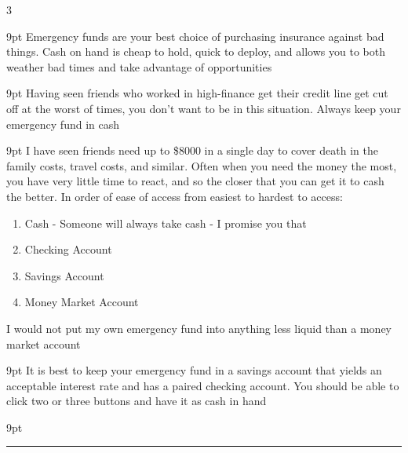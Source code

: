\documentclass[landscape]{article}
\newcommand{\myline}{\vspace{4pt}\hrule  \vspace{4pt}}
\newcommand{\commasep}[1]{\num[group-separator={,}]{#1}}
\newcommand{\money}[1]{\$\commasep{#1}}
\newenvironment{topic}[1]{
	\noindent \textbf{\textsc{\color{harvardcrimson}{#1}}}
	\noindent \hspace{-3.5pt}
}{
	\myline
}
\newenvironment{prin}[1]{
	\noindent \textit{\color{black}{#1}}
	\begin{adjustwidth}{9pt}{}
		\color{dark-grey}
	}{
	\end{adjustwidth}
}
\newenvironment{compactenum}{
	\begin{enumerate}[leftmargin=*,labelsep=5pt]
	}{
	\end{enumerate}
}
\begin{document}
\begin{multicols*}{3}
	\begin{topic}{Emergency Funds}
			
			\begin{prin}{Principal E\princount: The Principal of Emergency Funds: Emergency funds are your single largest priority until you get one - they are insurance on yourself} Emergency funds are your best choice of purchasing insurance against bad things. Cash on hand is cheap to hold, quick to deploy, and allows you to both weather bad times and take advantage of opportunities\end{prin}
			\begin{prin}{Principal E\princount: The Principal of Non-Emergency Credit: Emergency funds should never be ``credit lines'' including Home Equity lines, credit cards, etc.} Having seen friends who worked in high-finance get their credit line get cut off at the worst of times, you don't want to be in this situation. Always keep your emergency fund in cash\end{prin}
			\begin{prin}{Principal E\princount: The Principal of Emergency Fund Liquidity: Your emergency fund should be able to be at least 70\% convertible to cash in a day and 100\% by three days} I have seen friends need up to \money{8000} in a single day to cover death in the family costs, travel costs, and similar. Often when you need the money the most, you have very little time to react, and so the closer that you can get it to cash the better. In order of ease of access from easiest to hardest to access:
			\begin{compactenum}
				\item Cash - Someone will always take cash - I promise you that \item Checking Account \item Savings Account \item Money Market Account 
			\end{compactenum} I would not put my own emergency fund into anything less liquid than a money market account \end{prin}
	
			\begin{prin}{Principal E\princount: The Principal of Emergency Fund Interest: You don't care about interest on your emergency fund, you care about how quickly you can convert it to cash} It is best to keep your emergency fund in a savings account that yields an acceptable interest rate and has a paired checking account. You should be able to click two or three buttons and have it as cash in hand\end{prin}
			\begin{prin}{Principal E\princount: The Principal of Emergency Fund Sizing: You should size your emergency fund to the maximum of \$15,000 and 6 months expenses - whichever is greater} \end{prin}


\end{topic}
\end{multicols*}
\end{document}
